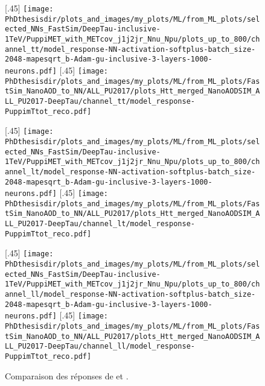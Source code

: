 \begin{figure}[p]
\centering

[.45\textwidth]
{\texttt{[image: \\PhDthesisdir/plots\_and\_images/my\_plots/ML/from\_ML\_plots/selected\_NNs\_FastSim/DeepTau-inclusive-1TeV/PuppiMET\_with\_METcov\_j1j2jr\_Nnu\_Npu/plots\_up\_to\_800/channel\_tt/model\_response-NN-activation-softplus-batch\_size-2048-mapesqrt\_b-Adam-gu-inclusive-3-layers-1000-neurons.pdf]}\vspace{-.5\baselineskip}}
\hfill
{}[.45\textwidth]
{\texttt{[image: \\PhDthesisdir/plots\_and\_images/my\_plots/ML/from\_ML\_plots/FastSim\_NanoAOD\_to\_NN/ALL\_PU2017/plots\_Htt\_merged\_NanoAODSIM\_ALL\_PU2017-DeepTau/channel\_tt/model\_response-PuppimTtot\_reco.pdf]}\vspace{-.5\baselineskip}}

[.45\textwidth]
{\texttt{[image: \\PhDthesisdir/plots\_and\_images/my\_plots/ML/from\_ML\_plots/selected\_NNs\_FastSim/DeepTau-inclusive-1TeV/PuppiMET\_with\_METcov\_j1j2jr\_Nnu\_Npu/plots\_up\_to\_800/channel\_lt/model\_response-NN-activation-softplus-batch\_size-2048-mapesqrt\_b-Adam-gu-inclusive-3-layers-1000-neurons.pdf]}\vspace{-.5\baselineskip}}
\hfill
{}[.45\textwidth]
{\texttt{[image: \\PhDthesisdir/plots\_and\_images/my\_plots/ML/from\_ML\_plots/FastSim\_NanoAOD\_to\_NN/ALL\_PU2017/plots\_Htt\_merged\_NanoAODSIM\_ALL\_PU2017-DeepTau/channel\_lt/model\_response-PuppimTtot\_reco.pdf]}\vspace{-.5\baselineskip}}

[.45\textwidth]
{\texttt{[image: \\PhDthesisdir/plots\_and\_images/my\_plots/ML/from\_ML\_plots/selected\_NNs\_FastSim/DeepTau-inclusive-1TeV/PuppiMET\_with\_METcov\_j1j2jr\_Nnu\_Npu/plots\_up\_to\_800/channel\_ll/model\_response-NN-activation-softplus-batch\_size-2048-mapesqrt\_b-Adam-gu-inclusive-3-layers-1000-neurons.pdf]}\vspace{-.5\baselineskip}}
\hfill
{}[.45\textwidth]
{\texttt{[image: \\PhDthesisdir/plots\_and\_images/my\_plots/ML/from\_ML\_plots/FastSim\_NanoAOD\_to\_NN/ALL\_PU2017/plots\_Htt\_merged\_NanoAODSIM\_ALL\_PU2017-DeepTau/channel\_ll/model\_response-PuppimTtot\_reco.pdf]}\vspace{-.5\baselineskip}}

\caption{Comparaison des réponses de \mml et \mTtot.}
\label{fig-BpprimevsMTTOT-resp}
\end{figure}
